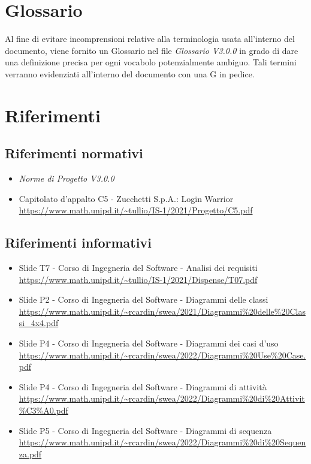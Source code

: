 \section{Glossario}
Al fine di evitare incomprensioni relative alla terminologia usata all'interno del documento, viene fornito un Glossario nel file \textit{Glossario V3.0.0} in grado di dare una definizione precisa per ogni vocabolo potenzialmente ambiguo. Tali termini verranno evidenziati all'interno del documento con una G in pedice.

\section{Riferimenti}
\subsection{Riferimenti normativi}
\begin{itemize}
  \item \textit{Norme di Progetto V3.0.0}
  \item Capitolato d'appalto C5 - Zucchetti S.p.A.: Login Warrior \\
  \url{https://www.math.unipd.it/~tullio/IS-1/2021/Progetto/C5.pdf}
\end{itemize}

\subsection{Riferimenti informativi}
\begin{itemize}
  \item Slide T7 - Corso di Ingegneria del Software - Analisi dei requisiti \\
  \url{https://www.math.unipd.it/~tullio/IS-1/2021/Dispense/T07.pdf}
  \item Slide P2 - Corso di Ingegneria del Software - Diagrammi delle classi \\
  \url{https://www.math.unipd.it/~rcardin/swea/2021/Diagrammi%20delle%20Classi_4x4.pdf}
  \item Slide P4 - Corso di Ingegneria del Software - Diagrammi dei casi d'uso \\
  \url{https://www.math.unipd.it/~rcardin/swea/2022/Diagrammi%20Use%20Case.pdf}
  \item Slide P4 - Corso di Ingegneria del Software - Diagrammi di attività \\
  \url{https://www.math.unipd.it/~rcardin/swea/2022/Diagrammi%20di%20Attivit\%C3\%A0.pdf}  %
  \item Slide P5 - Corso di Ingegneria del Software - Diagrammi di sequenza \\
  \url{https://www.math.unipd.it/~rcardin/swea/2022/Diagrammi%20di%20Sequenza.pdf}
\end{itemize}
